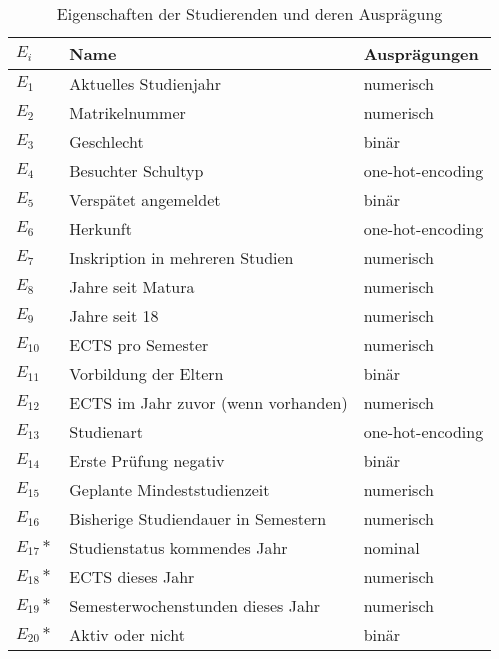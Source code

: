 \begin{table}[ht]
  \caption{\label{tab:name} Eigenschaften der Studierenden und deren Auspr\"agung}
  \begin{tabular}{ p{1cm} p{7cm}  p{5cm} }
    \toprule
    $E_i$     & Name                                & Ausprägungen     \\
    \midrule
    $E_1$     & Aktuelles Studienjahr               & numerisch        \\
    $E_2$     & Matrikelnummer                      & numerisch        \\
    $E_3$     & Geschlecht                          & binär            \\
    $E_4$     & Besuchter Schultyp                  & one-hot-encoding \\
    $E_5$     & Verspätet angemeldet                & binär            \\
    $E_6$     & Herkunft                            & one-hot-encoding \\
    $E_7$     & Inskription in mehreren Studien     & numerisch        \\
    $E_8$     & Jahre seit Matura                   & numerisch        \\
    $E_9$     & Jahre seit 18                       & numerisch        \\
    $E_{10}$  & ECTS pro Semester                   & numerisch        \\
    $E_{11}$  & Vorbildung der Eltern               & binär            \\
    $E_{12}$  & ECTS im Jahr zuvor (wenn vorhanden) & numerisch        \\
    $E_{13}$  & Studienart                          & one-hot-encoding \\
    $E_{14}$  & Erste Prüfung negativ               & binär            \\
    $E_{15}$  & Geplante Mindeststudienzeit         & numerisch        \\
    $E_{16}$  & Bisherige Studiendauer in Semestern & numerisch        \\
    $E_{17}*$ & Studienstatus kommendes Jahr        & nominal          \\
    $E_{18}*$ & ECTS dieses Jahr                    & numerisch        \\
    $E_{19}*$ & Semesterwochenstunden dieses Jahr   & numerisch        \\
    $E_{20}*$ & Aktiv oder nicht                    & binär            \\
    \bottomrule
  \end{tabular}

\end{table}

